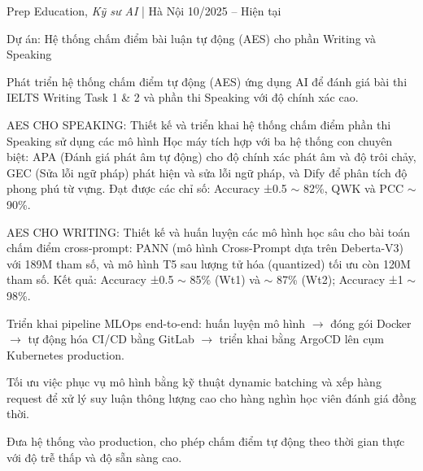 
\begin{cventries2}

  \cventrynew
  {Prep Education, \textnormal{\textit{Kỹ sư AI} | Hà Nội}}
  {10/2025 -- Hiện tại}
  {}

\end{cventries2}

\vspace{-10pt}

\begin{cventries}

  \cventry
    {Dự án: Hệ thống chấm điểm bài luận tự động (AES) cho phần Writing và Speaking}
    {}
    {
      \begin{cvitems}
        \item {Phát triển hệ thống chấm điểm tự động (AES) ứng dụng AI để đánh giá bài thi IELTS Writing Task 1 \& 2 và phần thi Speaking với độ chính xác cao.}
        \item {AES CHO SPEAKING: Thiết kế và triển khai hệ thống chấm điểm phần thi Speaking sử dụng các mô hình Học máy tích hợp với ba hệ thống con chuyên biệt: APA (Đánh giá phát âm tự động) cho độ chính xác phát âm và độ trôi chảy, GEC (Sửa lỗi ngữ pháp) phát hiện và sửa lỗi ngữ pháp, và Dify để phân tích độ phong phú từ vựng. Đạt được các chỉ số: Accuracy ±0.5 $\sim$ 82\%, QWK và PCC $\sim$ 90\%.}
        \item {AES CHO WRITING: Thiết kế và huấn luyện các mô hình học sâu cho bài toán chấm điểm cross-prompt: PANN (mô hình Cross-Prompt dựa trên Deberta-V3) với 189M tham số, và mô hình T5 sau lượng tử hóa (quantized) tối ưu còn 120M tham số. Kết quả: Accuracy ±0.5 $\sim$ 85\% (Wt1) và $\sim$ 87\% (Wt2); Accuracy ±1 $\sim$ 98\%.}
        \item {Triển khai pipeline MLOps end-to-end: huấn luyện mô hình $\rightarrow$ đóng gói Docker $\rightarrow$ tự động hóa CI/CD bằng GitLab $\rightarrow$ triển khai bằng ArgoCD lên cụm Kubernetes production.}
        \item {Tối ưu việc phục vụ mô hình bằng kỹ thuật dynamic batching và xếp hàng request để xử lý suy luận thông lượng cao cho hàng nghìn học viên đánh giá đồng thời.}
        \item {Đưa hệ thống vào production, cho phép chấm điểm tự động theo thời gian thực với độ trễ thấp và độ sẵn sàng cao.}
      \end{cvitems}
    }


\end{cventries}
